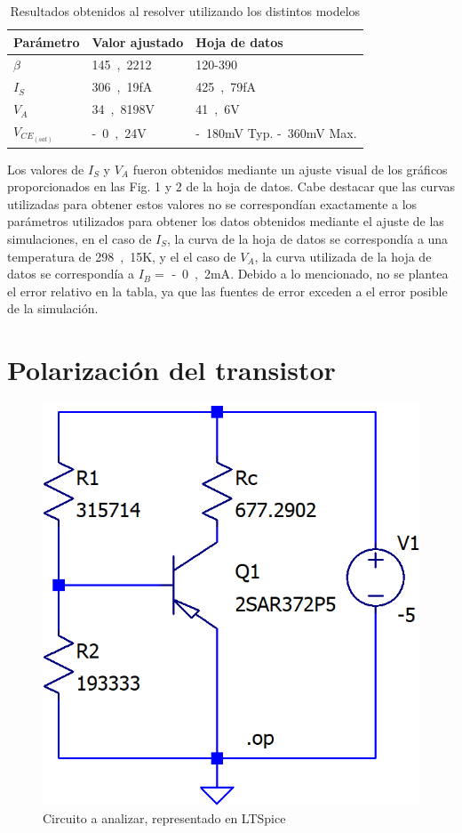 \documentclass[10pt]{article}
\begin{document}
\begin{table}[ht!]
  \begin{center}
    \caption{Resultados obtenidos al resolver utilizando los distintos modelos}
    \label{tab:cuadrode_resultados}  %
    \begin{tabular}{|l|l|l|} %
    \hline
      Parámetro & Valor ajustado & Hoja de datos\\ 
      \hline
      $\beta$ & \si{145,2212} & \si{120}-\si{390} \\
      \hline        %
      $I_S$ & \si{306,19}{fA} & \si{425,79}{fA} \\
      \hline
      $V_A$ & \si{34,8198}{V} & \si{41,6}{V} \\ 
      \hline
      $V_{CE_{(sat)}}$ & \si{-0,24}{V} & \si{-180}{mV} Typ. \si{-360}{mV} Max. \\
      \hline
    \end{tabular}
  \end{center}
  
\end{table}
\quad Los valores de $I_S$ y $V_A$ fueron obtenidos mediante un ajuste visual de los gráficos proporcionados en las Fig. 1 y 2 de la hoja de datos. Cabe destacar que las curvas utilizadas para obtener estos valores no se correspondían exactamente a los parámetros utilizados para obtener los datos obtenidos mediante el ajuste de las simulaciones, en el caso de $I_S$, la curva de la hoja de datos se correspondía a una temperatura de \si{298,15}{K}, y el el caso de $V_A$, la curva utilizada de la hoja de datos se correspondía a $I_B = $ \si{-0,2}{mA}. Debido a lo mencionado, no se plantea el error relativo en la tabla, ya que las fuentes de error exceden a el error posible de la simulación.

\section{Polarización del transistor}

\begin{figure}[ht!]
    \centering
    \includegraphics[width= 0.35\linewidth]{resources/simulacion_polarizacion.png}
    \caption{Circuito a analizar, representado en LTSpice}
    \label{fig:simulacion_polarizacion}
\end{figure}
\end{document}
